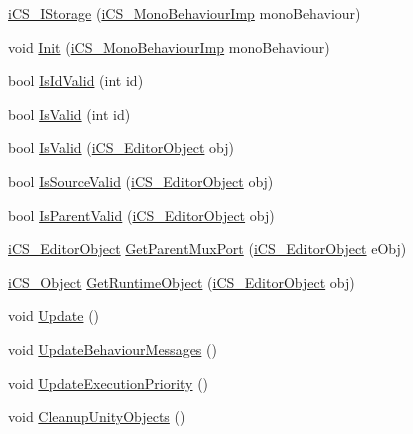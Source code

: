 \begin{DoxyCompactItemize}
\item 
\hyperlink{classi_c_s___i_storage_aaacaa8f607cff8c00706c7af6aa692ca}{i\+C\+S\+\_\+\+I\+Storage} (\hyperlink{classi_c_s___mono_behaviour_imp}{i\+C\+S\+\_\+\+Mono\+Behaviour\+Imp} mono\+Behaviour)
\item 
void \hyperlink{classi_c_s___i_storage_a718e04935056f4e25deca81bf0be7702}{Init} (\hyperlink{classi_c_s___mono_behaviour_imp}{i\+C\+S\+\_\+\+Mono\+Behaviour\+Imp} mono\+Behaviour)
\item 
bool \hyperlink{classi_c_s___i_storage_ac5a3da68bfe8e33dd9ad97dceda9cb39}{Is\+Id\+Valid} (int id)
\item 
bool \hyperlink{classi_c_s___i_storage_a1e980e6b3ff1efe5068665d23eb3221a}{Is\+Valid} (int id)
\item 
bool \hyperlink{classi_c_s___i_storage_a1cb14b9ba38a9d4beaaca0c27c351576}{Is\+Valid} (\hyperlink{classi_c_s___editor_object}{i\+C\+S\+\_\+\+Editor\+Object} obj)
\item 
bool \hyperlink{classi_c_s___i_storage_af24fe52aabe8d7ffe2e39d1952323411}{Is\+Source\+Valid} (\hyperlink{classi_c_s___editor_object}{i\+C\+S\+\_\+\+Editor\+Object} obj)
\item 
bool \hyperlink{classi_c_s___i_storage_a0df53664269a71e4f0d21d01a8a6c7ad}{Is\+Parent\+Valid} (\hyperlink{classi_c_s___editor_object}{i\+C\+S\+\_\+\+Editor\+Object} obj)
\item 
\hyperlink{classi_c_s___editor_object}{i\+C\+S\+\_\+\+Editor\+Object} \hyperlink{classi_c_s___i_storage_ae480da8186a2cd8b2a44210e871b7075}{Get\+Parent\+Mux\+Port} (\hyperlink{classi_c_s___editor_object}{i\+C\+S\+\_\+\+Editor\+Object} e\+Obj)
\item 
\hyperlink{classi_c_s___object}{i\+C\+S\+\_\+\+Object} \hyperlink{classi_c_s___i_storage_a5bc8f47e54624b86d5641082769720e0}{Get\+Runtime\+Object} (\hyperlink{classi_c_s___editor_object}{i\+C\+S\+\_\+\+Editor\+Object} obj)
\item 
void \hyperlink{classi_c_s___i_storage_a77043a93da7cd68e69ccb194ec17038f}{Update} ()
\item 
void \hyperlink{classi_c_s___i_storage_ab41436ebf3cbfeba8dd8faff68b010bb}{Update\+Behaviour\+Messages} ()
\item 
void \hyperlink{classi_c_s___i_storage_a84e99c376c431c11f39cb00b232ce535}{Update\+Execution\+Priority} ()
\item 
void \hyperlink{classi_c_s___i_storage_a67ae34668b1cd8c0eaad9a9c700ffee2}{Cleanup\+Unity\+Objects} ()

\end{DoxyCompactItemize}
